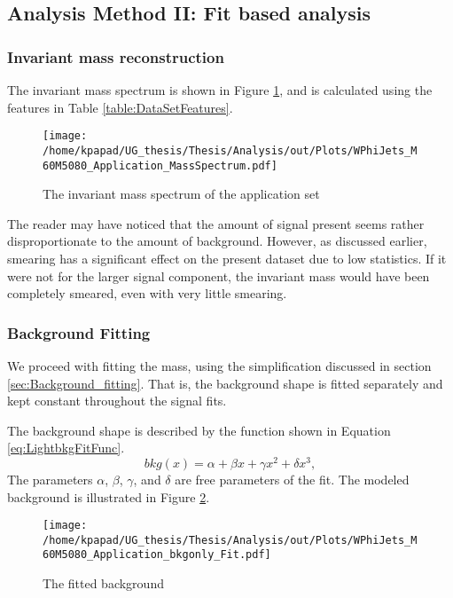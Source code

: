 \subsection{Analysis Method II: Fit based analysis}
\label{sec:org80aa8a7}
\label{sec:LightAnalysis_method2}
\subsubsection{Invariant mass reconstruction}
\label{sec:org7c38b7f}
\label{sec:Light_invariant_mass_reconstruction}
 The invariant mass spectrum is shown in Figure \ref{fig:LightAppMass}, and  is calculated using the features in Table \ref{table:DataSetFeatures}. 
\begin{figure}[h!]
\centering
\texttt{[image: /home/kpapad/UG\_thesis/Thesis/Analysis/out/Plots/WPhiJets\_M60M5080\_Application\_MassSpectrum.pdf]}
\caption{The invariant mass spectrum of the application set}
\label{fig:LightAppMass}
\end{figure}

The reader may have noticed that the amount of signal present seems rather disproportionate to the amount of background. However, as discussed earlier, smearing has a significant effect on the present dataset due to low statistics. If it were not for the larger signal component, the invariant mass would have been completely smeared, even with very little smearing.
\subsubsection{Background Fitting}
\label{sec:orgbda19a9}
\label{sec:Light_background_fitting}
We proceed with fitting the mass, using the simplification discussed in section \ref{sec:Background_fitting}. That is, the background shape is fitted separately and kept constant throughout the signal fits.

The background shape is described by the function shown in Equation \ref{eq:LightbkgFitFunc}.
\begin{equation}
bkg(x) =  \alpha + \beta x + \gamma x^2 + \delta x^3,
\label{eq:LightbkgFitFunc}
\end{equation}
The parameters \(\alpha\), \(\beta\), \(\gamma\), and \(\delta\) are free parameters of the fit. The modeled background is illustrated in Figure \ref{fig:LightBKGfit}.
\begin{figure}[h!]
\centering
\texttt{[image: /home/kpapad/UG\_thesis/Thesis/Analysis/out/Plots/WPhiJets\_M60M5080\_Application\_bkgonly\_Fit.pdf]}
\caption{The fitted background}
\label{fig:LightBKGfit}
\end{figure}
